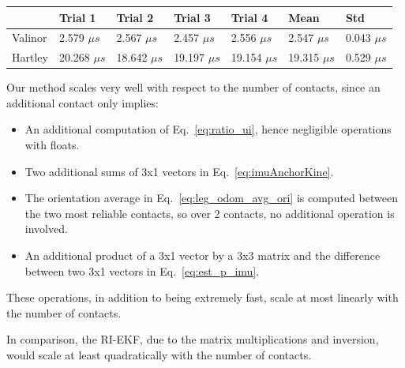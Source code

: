 \begin{table}[!h]
  \begin{center}
        \begin{tabu}to\linewidth{| X[c] | X[c] | X[c] | X[c] | X[c] | X[c] | X[c] | }
            \hline
              & Trial 1 & Trial 2 & Trial 3 & Trial 4 & Mean & Std \\
            \hline
             Valinor & 2.579 $\mu s$  & 2.567 $\mu s$  & 2.457 $\mu s$  & 2.556 $\mu s$  & 2.547 $\mu s$ & 0.043 $\mu s$ \\
             \hline 
             Hartley & 20.268 $\mu s$ & 18.642 $\mu s$ & 19.197 $\mu s$ & 19.154 $\mu s$ & 19.315 $\mu s$ & 0.529 $\mu s$ \\
            \hline     
        \end{tabu}
    \end{center}
\end{table}

Our method scales very well with respect to the number of contacts, since an additional contact only implies:
\begin{itemize}
  \item An additional computation of Eq.~\eqref{eq:ratio_ui}, hence negligible operations with floats.
  \item Two additional sums of 3x1 vectors in Eq.~\eqref{eq:imuAnchorKine}.
  \item The orientation average in Eq.~\eqref{eq:leg_odom_avg_ori} is computed between the two most reliable contacts, so over 2 contacts, no additional operation is involved. 
  \item An additional product of a 3x1 vector by a 3x3 matrix and the difference between two 3x1 vectors in Eq.~\eqref{eq:est_p_imu}.
\end{itemize}

These operations, in addition to being extremely fast, scale at most linearly with the number of contacts.


In comparison, the RI-EKF, due to the matrix multiplications and inversion, would scale at least quadratically with the number of contacts.

